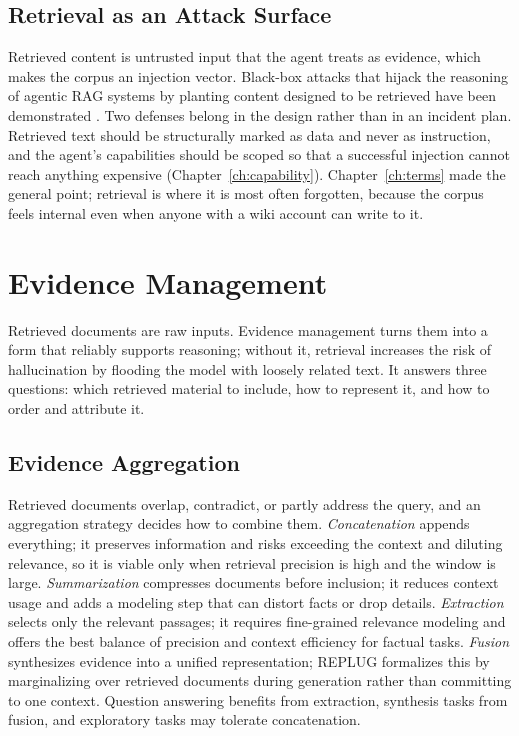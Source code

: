 \documentclass[11pt]{book}
\begin{document}
\subsection{Retrieval as an Attack Surface}

Retrieved content is untrusted input that the agent treats as evidence, which makes the corpus an injection vector. Black-box attacks that hijack the reasoning of agentic RAG systems by planting content designed to be retrieved have been demonstrated \cite{kidnaprag2026}. Two defenses belong in the design rather than in an incident plan. Retrieved text should be structurally marked as data and never as instruction, and the agent's capabilities should be scoped so that a successful injection cannot reach anything expensive (Chapter~\ref{ch:capability}). Chapter~\ref{ch:terms} made the general point; retrieval is where it is most often forgotten, because the corpus feels internal even when anyone with a wiki account can write to it.

\section{Evidence Management}

Retrieved documents are raw inputs. Evidence management turns them into a form that reliably supports reasoning; without it, retrieval increases the risk of hallucination by flooding the model with loosely related text. It answers three questions: which retrieved material to include, how to represent it, and how to order and attribute it.

\subsection{Evidence Aggregation}

Retrieved documents overlap, contradict, or partly address the query, and an aggregation strategy decides how to combine them. \textit{Concatenation} appends everything; it preserves information and risks exceeding the context and diluting relevance, so it is viable only when retrieval precision is high and the window is large. \textit{Summarization} compresses documents before inclusion; it reduces context usage and adds a modeling step that can distort facts or drop details. \textit{Extraction} selects only the relevant passages; it requires fine-grained relevance modeling and offers the best balance of precision and context efficiency for factual tasks. \textit{Fusion} synthesizes evidence into a unified representation; REPLUG \cite{replug} formalizes this by marginalizing over retrieved documents during generation rather than committing to one context. Question answering benefits from extraction, synthesis tasks from fusion, and exploratory tasks may tolerate concatenation.
\end{document}
